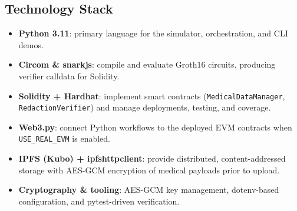 \subsection{Technology Stack}
\begin{itemize}
    \item \textbf{Python 3.11}: primary language for the simulator, orchestration, and CLI demos.
    \item \textbf{Circom \& snarkjs}: compile and evaluate Groth16 circuits, producing verifier calldata for Solidity.
    \item \textbf{Solidity + Hardhat}: implement smart contracts (\texttt{MedicalDataManager}, \texttt{RedactionVerifier}) and manage deployments, testing, and coverage.
    \item \textbf{Web3.py}: connect Python workflows to the deployed EVM contracts when \texttt{USE\_REAL\_EVM} is enabled.
    \item \textbf{IPFS (Kubo) + ipfshttpclient}: provide distributed, content-addressed storage with AES-GCM encryption of medical payloads prior to upload.
    \item \textbf{Cryptography \& tooling}: AES-GCM key management, dotenv-based configuration, and pytest-driven verification.
\end{itemize}
